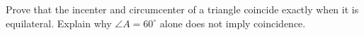 Prove that the incenter and circumcenter of a triangle coincide exactly when it is equilateral. Explain why $\angle A=60^\circ$ alone does not imply coincidence.

